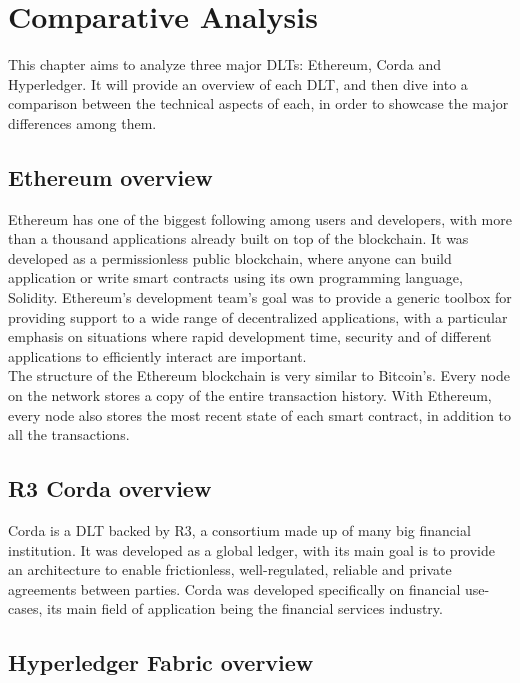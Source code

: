 \chapter{Comparative Analysis}
\label{chap:comparative-analysis}

This chapter aims to analyze three major DLTs: Ethereum, Corda and Hyperledger. It will provide an overview of each DLT, and then dive into a comparison between the technical aspects of each, in order to showcase the major differences among them.

\section{Ethereum overview}

Ethereum has one of the biggest following among users and developers, with more than a thousand applications already built on top of the blockchain. It was developed as a permissionless public blockchain, where anyone can build application or write smart contracts using its own programming language, Solidity. Ethereum's development team's goal was to provide a generic toolbox for providing support to a wide range of decentralized applications, with a particular emphasis on situations where rapid development time, security and of different applications to efficiently interact are important. \\

The structure of the Ethereum blockchain is very similar to Bitcoin's. Every node on the network stores a copy of the entire transaction history. With Ethereum, every node also stores the most recent state of each smart contract, in addition to all the transactions. 


\section{R3 Corda overview}
Corda is a DLT backed by R3, a consortium made up of many big financial institution. It was developed as a global ledger, with its main goal is to provide an architecture to enable frictionless, well-regulated, reliable and private agreements between parties. Corda was developed specifically on financial use-cases, its main field of application being the financial services industry.

\section{Hyperledger Fabric overview}
